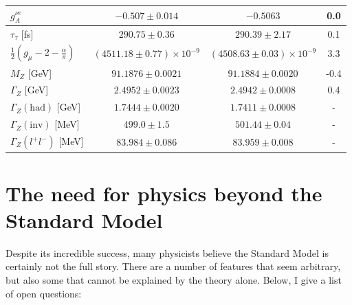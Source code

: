 \begin{table}[]
{\begin{tabular}{|l|c|c|c|}
\cellcolor[HTML]{F1A91E}$g^{\nu e}_A$                                             & $-0.507 \pm 0.014$                              & $-0.5063$                                       & 0.0               \\ \hline
\cellcolor[HTML]{F1A91E}$\tau_\tau$ {[}fs{]}                                      & $290.75 \pm 0.36$                               & $290.39 \pm 2.17$                               & 0.1               \\ \hline
\cellcolor[HTML]{F1A91E}$\frac{1}{2}\left(g_\mu - 2 - \frac{\alpha}{\pi} \right)$ & $\left( 4511.18 \pm 0.77\right) \times 10^{-9}$ & $\left(4508.63 \pm 0.03 \right) \times 10^{-9}$ & 3.3               \\ \hline
\cellcolor[HTML]{F1A91E}$M_Z$ {[}GeV{]}                                           & $91.1876 \pm 0.0021$                            & $91.1884 \pm 0.0020$                            & -0.4              \\ \hline
\cellcolor[HTML]{F1A91E}$\Gamma_Z$ {[}GeV{]}                                      & $2.4952 \pm 0.0023$                             & $2.4942 \pm 0.0008$                             & 0.4               \\ \hline
\cellcolor[HTML]{F1A91E}$\Gamma_Z (\textrm{had})$ {[}GeV{]}                                & $1.7444 \pm 0.0020$                             & $1.7411 \pm 0.0008$                             & -                 \\ \hline
\cellcolor[HTML]{F1A91E}$\Gamma_Z (\textrm{inv})$ {[}MeV{]}                                & $499.0 \pm 1.5$                                 & $501.44 \pm 0.04$                               & -                 \\ \hline
\cellcolor[HTML]{F1A91E}$\Gamma_Z \left(l^+ l^- \right)$ {[}MeV{]}                & $83.984 \pm 0.086$                              & $83.959 \pm 0.008$                              & -                 \\ \hline
\end{tabular}%
}
\end{table}



\section{The need for physics beyond the Standard Model}
\label{needforBSM}
Despite its incredible success, many physicists believe the Standard Model is certainly not the full story. There are a number of features that seem arbitrary, but also some that cannot be explained by the theory alone. Below, I give a list of open questions:

